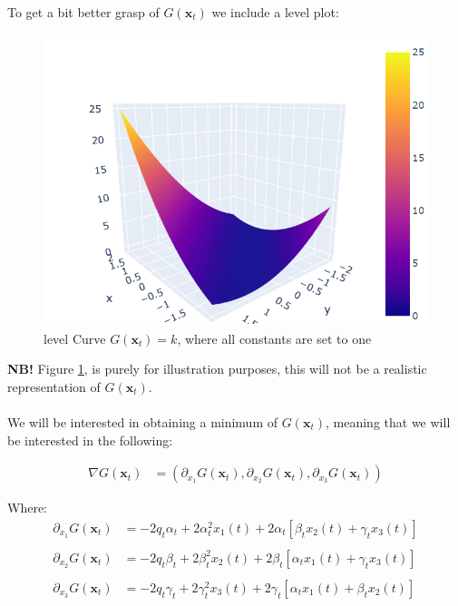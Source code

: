 \newpage 
To get a bit better grasp of $G(\mathbf{x}_{t})$ we include a level plot:

\begin{figure}[htp]
    \centering
    \includegraphics[width=12cm]{figures/SOFR/plot_G(x)_special_case.PNG}
    \caption{level Curve $G(\mathbf{x}_{t}) = k$, where all constants are set to one}
    \label{fig: plot_G(x)_SOFR_1M}
\end{figure}

\textbf{NB!} Figure \ref{fig: plot_G(x)_SOFR_1M}, is purely for illustration purposes, this will not be a realistic representation of $G(\mathbf{x}_{t})$. 
\\~\\
We will be interested in obtaining a minimum of $G(\mathbf{x}_{t})$, meaning that we will be interested in the following:  

\begin{align*}
\nabla G(\mathbf{x}_{t}) &= 
\left(
\partial_{x_{1}}G(\mathbf{x}_{t}), 
\partial_{x_{2}}G(\mathbf{x}_{t}), 
\partial_{x_{3}}G(\mathbf{x}_{t})
\right) 
\end{align*}

Where: 
\begin{align*}
\partial_{x_{1}}G(\mathbf{x}_{t}) &= 
-2q_{t}\alpha_{t} 
+ 2 \alpha_{t}^{2}x_{1}(t)  
+ 2\alpha_{t}\left[
\beta_{t} x_{2}(t)+ \gamma_{t} x_{3}(t)
\right] \\ 
\\
\partial_{x_{2}}G(\mathbf{x}_{t}) &=
-2q_{t}\beta_{t}
+ 2\beta_{t}^{2} x_{2}(t)
+ 2\beta_{t}\left[
\alpha_{t} x_{1}(t) + \gamma_{t} x_{3}(t)
\right] \\ 
\\ 
\partial_{x_{3}}G(\mathbf{x}_{t}) &=
-2q_{t}\gamma_{t}
+ 2\gamma_{t}^{2}x_{3}(t)
+ 2\gamma_{t}\left[
\alpha_{t} x_{1}(t) + \beta_{t} x_{2}(t)
\right]
\end{align*}

